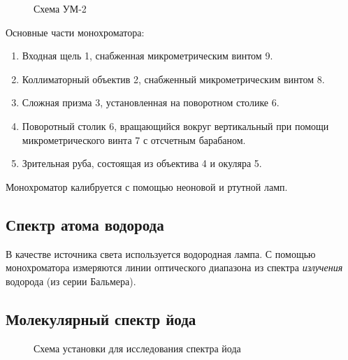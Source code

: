 \documentclass[12pt,a4paper]{article}
\begin{document}
\begin{figure}[ht!]\label{monochrome} 
\caption{Схема УМ-2}
\end{figure}

Основные части монохроматора:
\begin{enumerate}
\item Входная щель 1, снабженная микрометрическим винтом 9.
\item Коллиматорный объектив 2, снабженный микрометрическим винтом 8.
\item Сложная призма 3, установленная на поворотном столике 6.
\item Поворотный столик 6, вращающийся вокруг вертикальный при помощи микрометрического винта 7 с отсчетным барабаном.
\item Зрительная руба, состоящая из объектива 4 и окуляра 5.
\end{enumerate}

Монохроматор калибруется с помощью неоновой и ртутной ламп.

\subsection{Спектр атома водорода}

В качестве источника света используется водородная лампа. С помощью монохроматора измеряются линии оптического диапазона из спектра \textit{излучения} водорода (из серии Бальмера).

\newpage

\subsection{Молекулярный спектр йода}

\begin{figure}[ht!]\label{ischeme} 
\caption{Схема установки для исследования спектра йода}
\end{figure}
\end{document}
